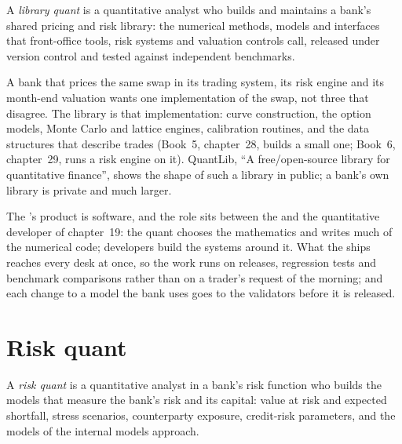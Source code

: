 \begin{definition}\label{def:in:bank-quant:library}
A \emph{library quant} is a quantitative analyst who builds and maintains a bank's shared pricing and
risk library: the numerical methods, models and interfaces that front-office tools, risk systems and valuation controls
call, released under version control and tested against independent benchmarks.
\end{definition}

A bank that prices the same swap in its trading system, its risk engine and its month-end valuation wants one
implementation of the swap, not three that disagree. The library is that implementation: curve construction, the option
models, Monte Carlo and lattice engines, calibration routines, and the data structures that describe trades (Book~5,
chapter~28, builds a small one; Book~6, chapter~29, runs a risk engine on it). QuantLib, ``A free/open-source library for
quantitative finance'', shows the shape of such a library in public; a bank's own library is private and much larger.

The 's product is software, and the role sits between the  and the quantitative developer of
chapter~19: the quant chooses the mathematics and writes much of the numerical code; developers build the systems around
it. What the  ships reaches every desk at once, so the work runs on releases, regression tests and
benchmark comparisons rather than on a trader's request of the morning; and each change to a model the bank uses goes to
the validators before it is released.

\section{Risk quant}

\begin{definition}\label{def:in:bank-quant:risk}
A \emph{risk quant} is a quantitative analyst in a bank's risk function who builds the models that
measure the bank's risk and its capital: value at risk and expected shortfall, stress scenarios, counterparty exposure,
credit-risk parameters, and the models of the internal models approach.
\end{definition}

